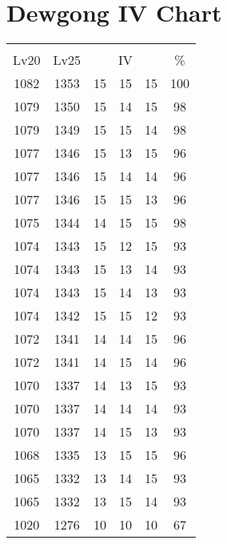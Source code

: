 \documentclass{article}%
\begin{document}
%
\normalsize%
\section{Dewgong IV Chart}%
\label{sec:Dewgong IV Chart}%
\renewcommand{\arraystretch}{1.5}%
\begin{tabular}{|c|c|c|c|c|c|}%
\hline%
\multicolumn{6}{|c|}{\textcolor{white}{ 
\linebreak{Dewgong}
}%
\cellcolor{black}}\\%
\multicolumn{1}{|c}{Lv20}&\multicolumn{1}{c|}{Lv25}&\multicolumn{3}{c|}{IV}&\multicolumn{1}{|c|}{\%}\\%
\hline%
\rowcolor{color100}%
1082&1353&15&15&15&100\\%
\hline%
\rowcolor{color98}%
1079&1350&15&14&15&98\\%
\hline%
\rowcolor{color98}%
1079&1349&15&15&14&98\\%
\hline%
\rowcolor{color96}%
1077&1346&15&13&15&96\\%
\hline%
\rowcolor{color96}%
1077&1346&15&14&14&96\\%
\hline%
\rowcolor{color96}%
1077&1346&15&15&13&96\\%
\hline%
\rowcolor{color98}%
1075&1344&14&15&15&98\\%
\hline%
\rowcolor{color93}%
1074&1343&15&12&15&93\\%
\hline%
\rowcolor{color93}%
1074&1343&15&13&14&93\\%
\hline%
\rowcolor{color93}%
1074&1343&15&14&13&93\\%
\hline%
\rowcolor{color93}%
1074&1342&15&15&12&93\\%
\hline%
\rowcolor{color96}%
1072&1341&14&14&15&96\\%
\hline%
\rowcolor{color96}%
1072&1341&14&15&14&96\\%
\hline%
\rowcolor{color93}%
1070&1337&14&13&15&93\\%
\hline%
\rowcolor{color93}%
1070&1337&14&14&14&93\\%
\hline%
\rowcolor{color93}%
1070&1337&14&15&13&93\\%
\hline%
\rowcolor{color96}%
1068&1335&13&15&15&96\\%
\hline%
\rowcolor{color93}%
1065&1332&13&14&15&93\\%
\hline%
\rowcolor{color93}%
1065&1332&13&15&14&93\\%
\hline%
\rowcolor{color91}%
1020&1276&10&10&10&67\\%
\end{tabular}

%
\end{document}

